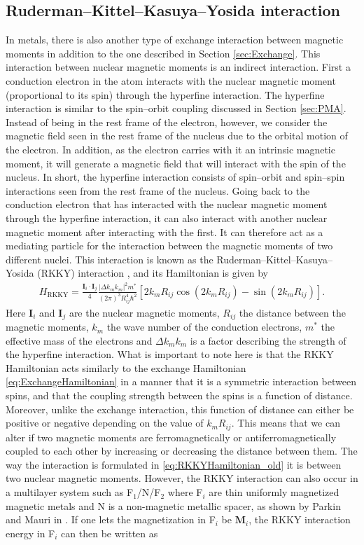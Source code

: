 \subsection{Ruderman--Kittel--Kasuya--Yosida interaction}
In metals, there is also another type of exchange interaction between magnetic moments in addition to the one described in Section \ref{sec:Exchange}. This interaction between nuclear magnetic moments is an indirect interaction. First a conduction electron in the atom interacts with the nuclear magnetic moment (proportional to its spin) through the hyperfine interaction. The hyperfine interaction is similar to the spin--orbit coupling discussed in Section \ref{sec:PMA}. Instead of being in the rest frame of the electron, however, we consider the magnetic field seen in the rest frame of the nucleus due to the orbital motion of the electron. In addition, as the electron carries with it an intrinsic magnetic moment, it will generate a magnetic field that will interact with the spin of the nucleus. In short, the hyperfine interaction consists of spin--orbit and spin--spin interactions seen from the rest frame of the nucleus. Going back to the conduction electron that has interacted with the nuclear magnetic moment through the hyperfine interaction, it can also interact with another nuclear magnetic moment after interacting with the first. It can therefore act as a mediating particle for the interaction between the magnetic moments of two different nuclei. This interaction is known as the Ruderman--Kittel--Kasuya--Yosida (RKKY) interaction \cite{RudermanKittel1954, Kasuya1956, Yosida1957, Vleck1962}, and its Hamiltonian is given by
\begin{align}
    \label{eq:RKKYHamiltonian_old}
    H_{\text{RKKY}} = \frac{\mathbold{I}_i\cdot\mathbold{I}_j}{4}\frac{|\Delta k_m k_m|^2m^*}{(2\pi)^3 R_{ij}^4 \hbar^2} \left[2k_mR_{ij}\cos\left(2k_mR_{ij}\right) - \sin \left(2k_mR_{ij}\right)\right].
\end{align}
Here $\mathbold{I}_i$ and $\mathbold{I}_j$ are the nuclear magnetic moments, $R_{ij}$ the distance between the magnetic moments, $k_m$ the wave number of the conduction electrons, $m^*$ the effective mass of the electrons and $\Delta k_m k_m$ is a factor describing the strength of the hyperfine interaction. What is important to note here is that the RKKY Hamiltonian acts similarly to the exchange Hamiltonian \eqref{eq:ExchangeHamiltonian} in a manner that it is a symmetric interaction between spins, and that the coupling strength between the spins is a function of distance. Moreover, unlike the exchange interaction, this function of distance can either be positive or negative depending on the value of $k_mR_{ij}$. This means that we can alter if two magnetic moments are ferromagnetically or antiferromagnetically coupled to each other by increasing or decreasing the distance between them. The way the interaction is formulated in \eqref{eq:RKKYHamiltonian_old} it is between two nuclear magnetic moments. However, the RKKY  interaction can also occur in a multilayer system such as F$_1$/N/F$_2$ where F$_i$ are thin uniformly magnetized magnetic metals and N is a non-magnetic metallic spacer, as shown by Parkin and Mauri in \cite{Parkin1991}. If one lets the magnetization in F$_i$ be $\mathbold{M}_i$, the RKKY interaction energy in F$_i$ can then be written as

